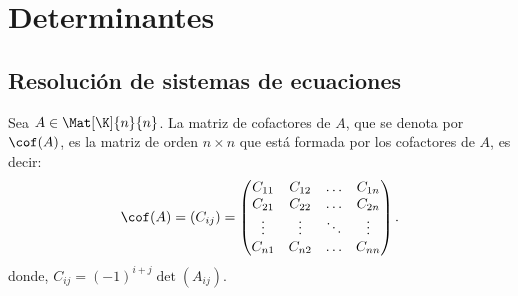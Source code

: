 \documentclass[compacto,10pt]{pubciencias-notas}
\begin{document}
    


\setcounter{section}{2}
\section{Determinantes}
\setcounter{subsection}{1}
\subsection{Resolución de sistemas de ecuaciones}

\begin{defi}
Sea $A\in\Mat[\K]{n}{n}$. La matriz de cofactores de $A$, que se denota por $\cof(A)$, es la matriz de orden $n \times n$ que está formada por los cofactores de $A$, es decir:
\[
\cof(A) = (C_{ij}) = 
\begin{pmatrix}
C_{11}&C_{12}&\ldots&C_{1n}\\
C_{21}&C_{22}&\ldots&C_{2n}\\
\vdots&\vdots&\ddots&\vdots\\
C_{n1}&C_{n2}&\ldots&C_{nn}
\end{pmatrix}.
\]
donde, $C_{ij} = (-1)^{i+j} \det (A_{ij})$.
\end{defi}
\end{document}
